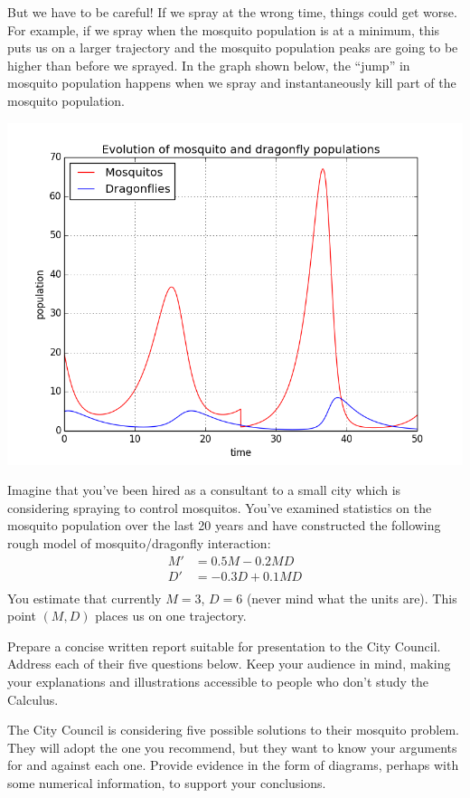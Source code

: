 \documentclass
[justified,nohyper]
{tufte-handout}
\begin{document}
But we have to be careful! If we spray at the wrong time, things could get worse. For example, if we spray when the mosquito population is at a minimum, this puts us on a larger trajectory and the mosquito population peaks are going to be higher than before we sprayed. In the graph shown below, the ``jump'' in mosquito population happens when we spray and instantaneously kill part of the mosquito population.

\includegraphics[scale=0.5]{pop_mosquitos_and_dragonflies_spray.png}

Imagine that you've been hired as a consultant to a small city which is considering spraying to control mosquitos. You've examined statistics on the mosquito population over the last 20 years and have constructed the following rough model of mosquito/dragonfly interaction:
\begin{align*}
    M' &= 0.5M - 0.2MD \\
    D' &= -0.3D + 0.1MD \\
\end{align*}
You estimate that currently $M=3$, $D=6$ (never mind what the units are). This point $(M,D)$ places us on one trajectory.

Prepare a concise written report suitable for presentation to the City Council. Address each of their five questions below. Keep your audience in mind, making your explanations and illustrations accessible to people who don't study the Calculus.

The City Council is considering five possible solutions to their mosquito problem. They will adopt the one you recommend, but they want to know your arguments for and against each one. Provide evidence in the form of diagrams, perhaps with some numerical information, to support your conclusions.
\end{document}

